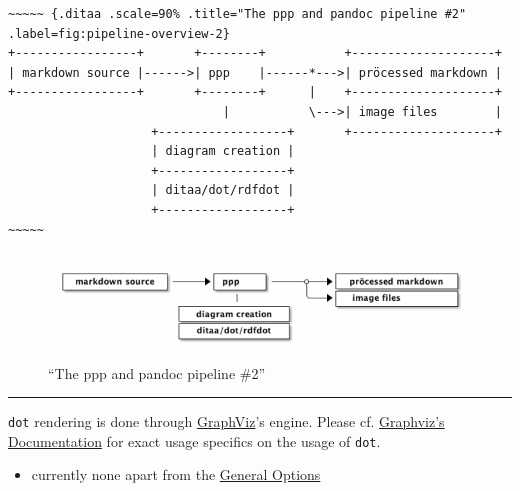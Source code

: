 \documentclass[]{article}
\begin{document}
\scriptsize

\begin{verbatim}
~~~~~ {.ditaa .scale=90% .title="The ppp and pandoc pipeline #2" .label=fig:pipeline-overview-2}
+-----------------+       +--------+           +--------------------+
| markdown source |------>| ppp    |------*--->| pröcessed markdown |
+-----------------+       +--------+      |    +--------------------+
                              |           \--->| image files        |
                    +------------------+       +--------------------+
                    | diagram creation |
                    +------------------+
                    | ditaa/dot/rdfdot |
                    +------------------+
~~~~~
\end{verbatim}

\normalsize

\begin{figure}[htbp]
\centering
\includegraphics{tmp/ppp-render-_6_eB/image-3.png}
\caption{``The ppp and pandoc pipeline
\#2''\label{fig:pipeline-overview-2}}
\end{figure}

\begin{center}\rule{3in}{0.4pt}\end{center}

\newpage


\texttt{dot} rendering is done through
\href{http://www.graphviz.org/}{GraphViz}'s engine. Please cf.
\href{http://www.graphviz.org/Documentation.php}{Graphviz's
Documentation} for exact usage specifics on the usage of \texttt{dot}.


\begin{itemize}
\itemsep1pt\parskip0pt
\item
  currently none apart from the \hyperref[general-options]{General
  Options}
\end{itemize}
\end{document}
